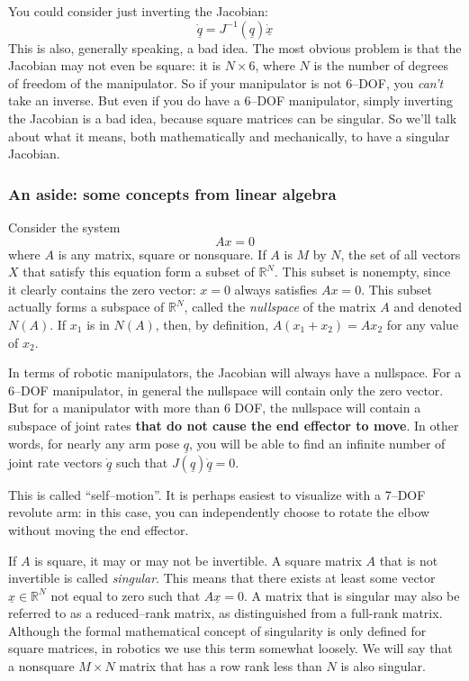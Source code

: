 \documentclass[]{article}
\begin{document}
You could consider just inverting the Jacobian:
\begin{displaymath}
\dot{\underline{q}} = J^{-1}(\underline{q})\dot{\underline{x}}
\end{displaymath}
This is also, generally speaking, a bad idea. The most obvious problem is that the Jacobian may not even be square: it is $N \times 6$, where $N$ is the number of degrees of freedom of the manipulator. So if your manipulator is not 6--DOF, you \textit{can't} take an inverse. But even if you do have a 6--DOF manipulator, simply inverting the Jacobian is a bad idea, because square matrices can be singular. So we'll talk about what it means, both mathematically and mechanically, to have a singular Jacobian.
 
 \subsubsection{An aside: some concepts from linear algebra}
Consider the system
\begin{displaymath}
Ax=0
\end{displaymath}
where $A$ is any matrix, square or nonsquare. If $A$ is $M$ by $N$, the set of all vectors $X$ that satisfy this equation form a subset of $\mathbb{R}^{N}$. This subset is nonempty, since it clearly contains the zero vector: $x = 0$ always satisfies $A x = 0$. This subset actually forms a subspace of $\mathbb{R}^{N}$, called the \textit{nullspace} of the matrix $A$ and denoted $N(A)$. If $x_{1}$ is in $N(A)$, then, by definition, $A(x_{1}+x_{2}) = Ax_{2}$ for any value of $x_{2}$. 

In terms of robotic manipulators, the Jacobian will always have a nullspace. For a 6--DOF manipulator, in general the nullspace will contain only the zero vector. But for a manipulator with more than 6 DOF, the nullspace will contain a subspace of joint rates \textbf{that do not cause the end effector to move}. In other words, for nearly any arm pose $\underline{q}$, you will be able to find an infinite number of joint rate vectors $\dot{\underline{q}}$ such that $J(\underline{q})\dot{\underline{q}} = 0$.

This is called ``self--motion''. It is perhaps easiest to visualize with a 7--DOF revolute arm: in this case, you can independently choose to rotate the elbow without moving the end effector.

If $A$ is square, it may or may not be invertible. A square matrix $A$ that is not invertible is called \textit{singular}. This means that there exists at least some vector $\underline{x} \in \mathbb{R}^{N}$ not equal to zero such that $A\underline{x}=0$. A matrix that is singular may also be referred to as a reduced--rank matrix, as distinguished from a full-rank matrix. Although the formal mathematical concept of singularity is only defined for square matrices, in robotics we use this term somewhat loosely. We will say that a nonsquare $M \times N$ matrix that has a row rank less than $N$ is also singular.
\end{document}
